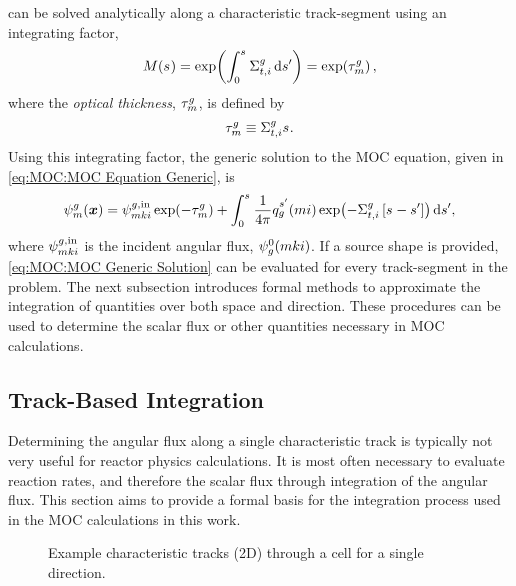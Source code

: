 {{         can be solved analytically along a characteristic track-segment using an integrating factor,
        \begin{equation}\label{eq:MOC:Integrating Factor}
            M(\len) = \exp\!\left(\intl[0][\len]\xst\dif{s'}\right) = \exp\!\left(\opt\right),
        \end{equation}
        where the \emph{optical thickness}, $\opt$, is defined by
        \begin{equation}\label{eq:MOC:Optical Thickness Definition}
            \opt \defined \xst\len.
        \end{equation}
        Using this integrating factor, the generic solution to the \ac{MOC} equation, given in \cref{eq:MOC:MOC Equation Generic}, is
        \begin{equation}\label{eq:MOC:MOC Generic Solution}
            \aflux = \afluxin\exp\!\left(-\opt\right) + \intl[0][\len]\rfourpi\source[mi][g][\len']\exp\!\left(-\xst\left[\len-\len'\right]\right)\dif{s'},
        \end{equation}
        where $\afluxin$ is the incident angular flux, $\aflux[mki][g][0]$.
        If a source shape is provided, \cref{eq:MOC:MOC Generic Solution} can be evaluated for every track-segment in the problem.
        The next subsection introduces formal methods to approximate the integration of quantities over both space and direction.
        These procedures can be used to determine the scalar flux or other quantities necessary in \ac{MOC} calculations.

        \subsection{Track-Based Integration}{\label{ssec:MOC:Track-Based Integration}
            Determining the angular flux along a single characteristic track is typically not very useful for reactor physics calculations.
            It is most often necessary to evaluate reaction rates, and therefore the scalar flux through integration of the angular flux.
            This section aims to provide a formal basis for the integration process used in the \ac{MOC} calculations in this work.

            \begin{figure}[h]
                \centering
                \def\svgwidth{0.4\linewidth}
                
                \caption{Example characteristic tracks (2D) through a cell for a single direction.}
                \label{fig:MOC:MOC Tracks}
            \end{figure}

}}}
